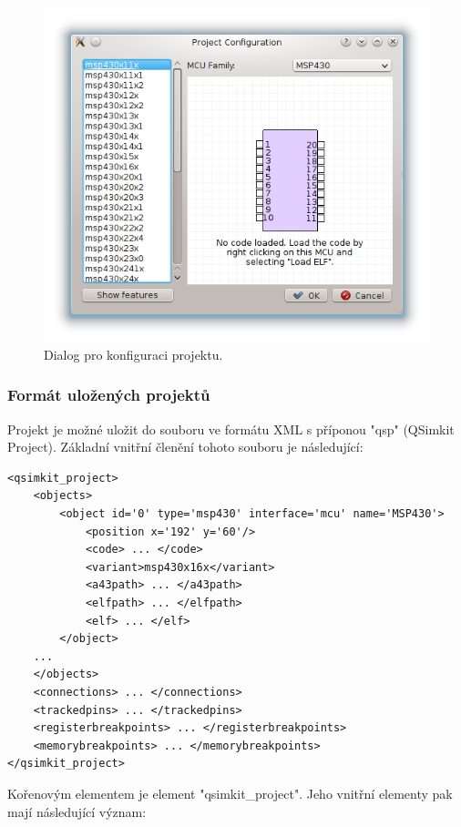 \begin{figure}[ht]
\centering
\includegraphics[trim=0cm 0cm 0cm 0cm, scale=0.7]{fig/projectconf}
\caption{Dialog pro konfiguraci projektu.}
\label{fig:projectconf}
\end{figure}

\subsubsection{Formát uložených projektů}

Projekt je možné uložit do souboru ve formátu XML s příponou "qsp" (QSimkit Project). Základní vnitřní členění tohoto souboru je následující:

\lstset{language=XML, numbers=left, frame=single, breaklines=true, tabsize=2, xleftmargin=20pt}
\begin{lstlisting}
<qsimkit_project>
	<objects>
		<object id='0' type='msp430' interface='mcu' name='MSP430'>
			<position x='192' y='60'/>
			<code> ... </code>
			<variant>msp430x16x</variant>
			<a43path> ... </a43path>
			<elfpath> ... </elfpath>
			<elf> ... </elf>
		</object>
	...
	</objects>
	<connections> ... </connections>
	<trackedpins> ... </trackedpins>
	<registerbreakpoints> ... </registerbreakpoints>
	<memorybreakpoints> ... </memorybreakpoints>
</qsimkit_project>
\end{lstlisting}

Kořenovým elementem je element "qsimkit\_project". Jeho vnitřní elementy pak mají následující význam:

